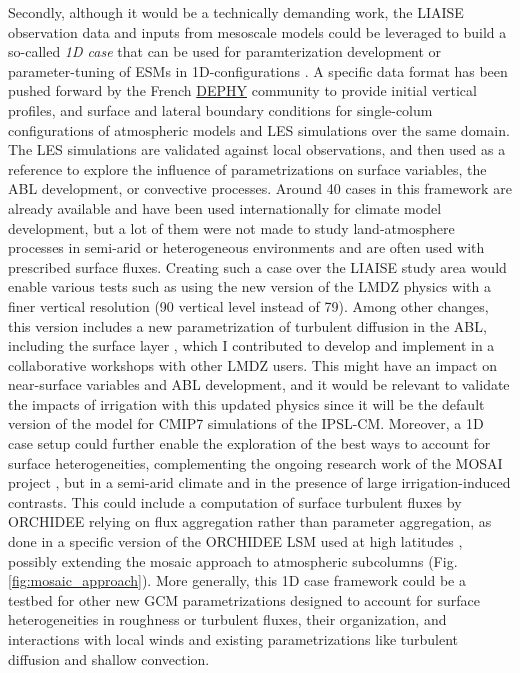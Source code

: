 Secondly, although it would be a technically demanding work, the LIAISE observation data and inputs from mesoscale models could be leveraged to build a so-called \textit{1D case} that can be used for paramterization development or parameter-tuning of ESMs in 1D-configurations \citep{couvreux_process-based_2021,hourdin_process-based_2021}. 
A specific data format has been pushed forward by the French \href{https://www.umr-cnrm.fr/dephy/}{DEPHY} community to provide initial vertical profiles, and surface and lateral boundary conditions for single-colum configurations of atmospheric models and LES simulations over the same domain. The LES simulations are validated against local observations, and then used as a reference to explore the influence of parametrizations on surface variables, the ABL development, or convective processes.
Around 40 cases in this framework are already available and have been used internationally for climate model development, but a lot of them were not made to study land-atmosphere processes in semi-arid or heterogeneous environments and are often used with prescribed surface fluxes. %
Creating such a case over the LIAISE study area would enable various tests such as using the new version of the LMDZ physics with a finer vertical resolution (90 vertical level instead of 79). Among other changes, this version includes a new parametrization of turbulent diffusion in the ABL, including the surface layer \citep{vignon_designing_2024}, which I contributed to develop and implement in a collaborative workshops with other LMDZ users. This might have an impact on near-surface variables and ABL development, and it would be relevant to validate the impacts of irrigation with this updated physics since it will be the default version of the model for CMIP7 simulations of the IPSL-CM.
Moreover, a 1D case setup could further enable the exploration of the best ways to account for surface heterogeneities, complementing the ongoing research work of the MOSAI project \citep{jome2024, lohou_model_2025}, but in a semi-arid climate and in the presence of large irrigation-induced contrasts.
This could include a computation of surface turbulent fluxes by ORCHIDEE relying on flux aggregation rather than parameter aggregation, as done in a specific version of the ORCHIDEE LSM used at high latitudes \citep[][]{guimberteau_orchidee-mict_2018, xi_assessment_2024}, possibly extending the mosaic approach to atmospheric subcolumns (Fig. \ref{fig:mosaic_approach}).
More generally, this 1D case framework could be a testbed for other new GCM parametrizations designed to account for surface heterogeneities in roughness or turbulent fluxes, their organization, and interactions with local winds and existing parametrizations like turbulent diffusion and shallow convection.


